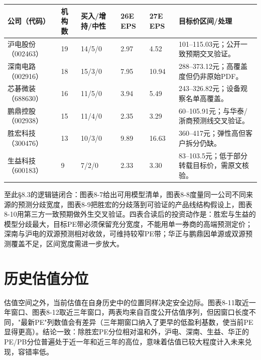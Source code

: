\begin{exhibitbox}[图表8-10：东方财富公开预测交叉验证]
\footnotesize
\begin{tabularx}{\textwidth}{L{1.8cm}R{1.2cm}L{2.0cm}R{1.4cm}R{1.4cm}X}
\toprule
\textbf{公司（代码）} & \textbf{机构数} & \textbf{买入/增持/中性} & \textbf{26E EPS} & \textbf{27E EPS} & \textbf{目标价区间/处理} \\
\midrule
沪电股份（002463） & 19 & 14/5/0 & 2.97 & 4.52 & 101--115.03元；公开一致预期交叉验证。 \\
深南电路（002916） & 18 & 15/3/0 & 7.95 & 10.94 & 288--373.12元；高覆盖度但仍非原始PDF。 \\
芯碁微装（688630） & 16 & 11/5/0 & 3.94 & 5.49 & 243--326.82元；设备观察名单高覆盖。 \\
鹏鼎控股（002938） & 15 & 11/4/0 & 2.35 & 3.29 & 60--105.91元；与华泰/浙商预测线交叉验证。 \\
胜宏科技（300476） & 13 & 10/3/0 & 9.89 & 16.63 & 360--417元；弹性高但客户拆分仍缺。 \\
生益科技（600183） & 9 & 7/2/0 & 2.33 & 3.30 & 83--103.5元；低于部分转载目标价，需原文核验。 \\
\bottomrule
\end{tabularx}
\end{exhibitbox}

至此§8.3的逻辑链闭合：图表8-7给出可用模型清单，图表8-8度量同一公司不同来源的预测分歧宽度，图表8-9把胜宏的分歧落到可验证的产品线结构假设上，图表8-10用第三方一致预期做外生交叉验证。四表合读后的投资动作是：胜宏与生益的模型分歧最大，目标PE带必须保留充分宽度，不能用单一券商的高端预测定价；深南与沪电的双源预测相对收敛，可维持较窄PE带；华正与鹏鼎因单源或双源预测覆盖不足，区间宽度需进一步放大。

\section{历史估值分位}

估值空间之外，当前估值在自身历史中的位置同样决定安全边际。图表8-11取近一年窗口、图表8-12取近三年窗口，两表均来自百度公开估值序列，但因窗口长度不同，"最新PE"列数值会有差异（三年期窗口纳入了更早的低盈利基数，使当前PE显得更高）。结论一致：除胜宏PE分位相对温和外，沪电、深南、生益、华正的PE/PB分位普遍处于近一年和近三年的高位，意味着估值已较大程度计入未来兑现，容错率低。

